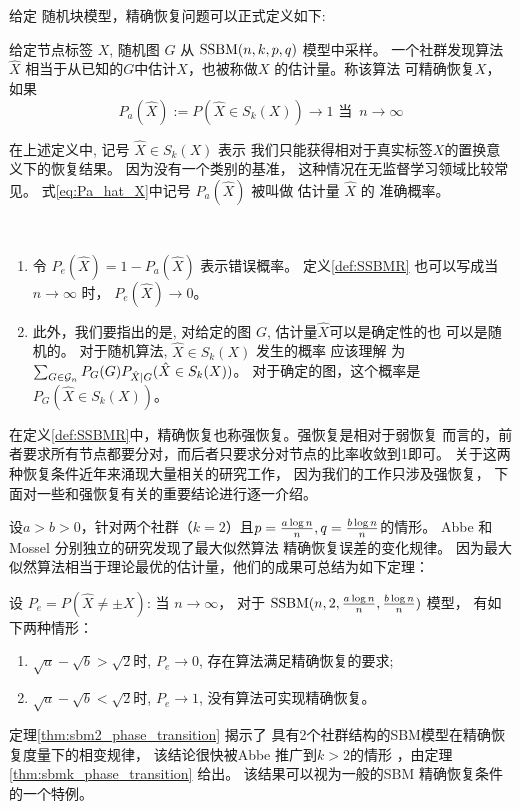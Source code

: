 给定 随机块模型，精确恢复问题可以正式定义如下:
\begin{definition} \label{def:SSBMR}
给定节点标签 $X$, 随机图 $G$ 从 $\operatorname{SSBM}(n,k,p,q)   $ 模型中采样。
一个社群发现算法$\hat{X}$ 相当于从已知的$G$中估计$X$，也被称做$X$
的估计量。称该算法
可精确恢复$X$，如果
\begin{equation}\label{eq:Pa_hat_X}
P_a(\hat{X}):=P(\hat{X} \in S_k(X)) \to 1 \textrm{ 当 }\, n \to \infty
\end{equation}
\end{definition}

在上述定义中, 记号 $\hat{X} \in S_k(X)$ 表示
我们只能获得相对于真实标签$X$的置换意义下的恢复结果。
因为没有一个类别的基准，
这种情况在无监督学习领域比较常见。
式\eqref{eq:Pa_hat_X}中记号 $P_a(\hat{X})$
被叫做 估计量 $\hat{X}$ 的
准确概率。
\begin{remark}\label{rem:metric_exact_recovery}\,
  \begin{enumerate}
    \item 令 $P_e(\hat{X}) = 1 - P_a(\hat{X})$
    表示错误概率。
    定义\ref{def:SSBMR} 也可以写成当$n\to \infty$
    时，
    $P_e(\hat{X}) \to 0$。
  \item  此外，我们要指出的是, 对给定的图 $G$, 估计量$\hat{X}$可以是确定性的也
  可以是随机的。
  对于随机算法, $\hat{X} \in S_k(X)$ 发生的概率 应该理解
  为 $\sum_{G \in \mathcal{G}_n} P_G(G) P_{\hat{X}|G}(\hat{X} \in S_k(X))$。 
  对于确定的图，这个概率是 $P_G(\hat{X} \in S_k(X))$。  
  \end{enumerate}
\end{remark}

在定义\ref{def:SSBMR}中，精确恢复也称强恢复。强恢复是相对于弱恢复
而言的，前者要求所有节点都要分对，而后者只要求分对节点的比率收敛到1即可。
关于这两种恢复条件近年来涌现大量相关的研究工作，
因为我们的工作只涉及强恢复，
下面对一些和强恢复有关的重要结论进行逐一介绍。

设$a>b>0$，针对两个社群（$k=2$）且$p=\frac{a \log n}{n},q=\frac{b \log n}{n}$的情形。
Abbe \cite{abbe2015exact} 和 Mossel
\cite{mossel2016} 分别独立的研究发现了最大似然算法
精确恢复误差的变化规律。
因为最大似然算法相当于理论最优的估计量，他们的成果可总结为如下定理：
\begin{theorem}\label{thm:sbm2_phase_transition}
设 $P_e=P(\hat{X} \neq \pm X)$: 当 $n \to \infty$，
对于 $\operatorname{SSBM}(n,2,\frac{a \log n}{n}, \frac{b \log n}{n})$ 模型，
有如下两种情形：
	\begin{enumerate}
		\item $\sqrt{a} - \sqrt{b} > \sqrt{2}$时,
    $P_e \to 0$, 存在算法满足精确恢复的要求;
		\item $\sqrt{a} - \sqrt{b} < \sqrt{2}$时,
    $P_e \to 1$, 没有算法可实现精确恢复。
	\end{enumerate}
\end{theorem}
定理\ref{thm:sbm2_phase_transition} 揭示了
具有2个社群结构的SBM模型在精确恢复度量下的相变规律，
该结论很快被Abbe 推广到$k>2$的情形
\cite{abbe2015community}，由定理
\ref{thm:sbmk_phase_transition} 给出。
该结果可以视为一般的SBM
精确恢复条件的一个特例。

